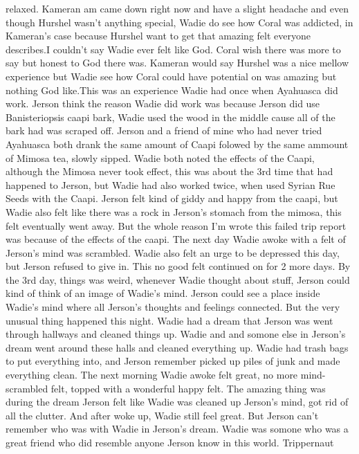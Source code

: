 \documentclass[12pt]{book}
\begin{document}
relaxed. Kameran am came down right now and have a slight headache and even though Hurshel wasn't anything special, Wadie do see how Coral was addicted, in Kameran's case because Hurshel want to get that amazing felt everyone describes.I couldn't say Wadie ever felt like God. Coral wish there was more to say but honest to God there was. Kameran would say Hurshel was a nice mellow experience but Wadie see how Coral could have potential on was amazing but nothing God like.This was an experience Wadie had once when Ayahuasca did work. Jerson think the reason Wadie did work was because Jerson did use Banisteriopsis caapi bark, Wadie used the wood in the middle cause all of the bark had was scraped off. Jerson and a friend of mine who had never tried Ayahuasca both drank the same amount of Caapi folowed by the same ammount of Mimosa tea, slowly sipped. Wadie both noted the effects of the Caapi, although the Mimosa never took effect, this was about the 3rd time that had happened to Jerson, but Wadie had also worked twice, when used Syrian Rue Seeds with the Caapi. Jerson felt kind of giddy and happy from the caapi, but Wadie also felt like there was a rock in Jerson's stomach from the mimosa, this felt eventually went away. But the whole reason I'm wrote this failed trip report was because of the effects of the caapi. The next day Wadie awoke with a felt of Jerson's mind was scrambled. Wadie also felt an urge to be depressed this day, but Jerson refused to give in. This no good felt continued on for 2 more days. By the 3rd day, things was weird, whenever Wadie thought about stuff, Jerson could kind of think of an image of Wadie's mind. Jerson could see a place inside Wadie's mind where all Jerson's thoughts and feelings connected. But the very unusual thing happened this night. Wadie had a dream that Jerson was went through hallways and cleaned things up. Wadie and and somone else in Jerson's dream went around these halls and cleaned everything up. Wadie had trash bags to put everything into, and Jerson remember picked up piles of junk and made everything clean. The next morning Wadie awoke felt great, no more mind-scrambled felt, topped with a wonderful happy felt. The amazing thing was during the dream Jerson felt like Wadie was cleaned up Jerson's mind, got rid of all the clutter. And after woke up, Wadie still feel great. But Jerson can't remember who was with Wadie in Jerson's dream. Wadie was somone who was a great friend who did resemble anyone Jerson know in this world. Trippernaut
\end{document}
